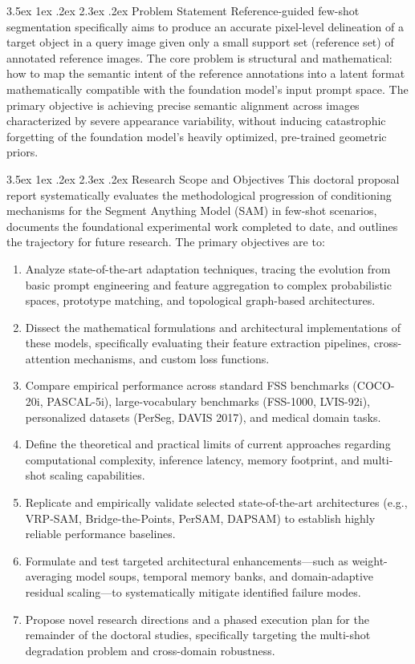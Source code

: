 \documentclass[journal,12pt,onecolumn,draftclsnofoot]{IEEEtran}
\makeatletter
\renewcommand{\section}{\@startsection{section}{1}{\z@}%
    {3.5ex \@plus 1ex \@minus .2ex}%
    {2.3ex \@plus.2ex}%
    {\normalfont\Large\bfseries}}
\makeatother
\begin{document}
\section{Problem Statement}
Reference-guided few-shot segmentation specifically aims to produce an accurate pixel-level delineation of a target object in a query image given only a small support set (reference set) of annotated reference images. The core problem is structural and mathematical: how to map the semantic intent of the reference annotations into a latent format mathematically compatible with the foundation model's input prompt space. The primary objective is achieving precise semantic alignment across images characterized by severe appearance variability, without inducing catastrophic forgetting of the foundation model's heavily optimized, pre-trained geometric priors.



\section{Research Scope and Objectives}
This doctoral proposal report systematically evaluates the methodological progression of conditioning mechanisms for the Segment Anything Model (SAM) in few-shot scenarios, documents the foundational experimental work completed to date, and outlines the trajectory for future research. The primary objectives are to:
\begin{enumerate}
    \item Analyze state-of-the-art adaptation techniques, tracing the evolution from basic prompt engineering and feature aggregation to complex probabilistic spaces, prototype matching, and topological graph-based architectures.
    \item Dissect the mathematical formulations and architectural implementations of these models, specifically evaluating their feature extraction pipelines, cross-attention mechanisms, and custom loss functions.
    \item Compare empirical performance across standard FSS benchmarks (COCO-20i, PASCAL-5i), large-vocabulary benchmarks (FSS-1000, LVIS-92i), personalized datasets (PerSeg, DAVIS 2017), and medical domain tasks.
    \item Define the theoretical and practical limits of current approaches regarding computational complexity, inference latency, memory footprint, and multi-shot scaling capabilities.
    \item Replicate and empirically validate selected state-of-the-art architectures (e.g., VRP-SAM, Bridge-the-Points, PerSAM, DAPSAM) to establish highly reliable performance baselines.
    \item Formulate and test targeted architectural enhancements---such as weight-averaging model soups, temporal memory banks, and domain-adaptive residual scaling---to systematically mitigate identified failure modes.
    \item Propose novel research directions and a phased execution plan for the remainder of the doctoral studies, specifically targeting the multi-shot degradation problem and cross-domain robustness.
\end{enumerate}
\end{document}
